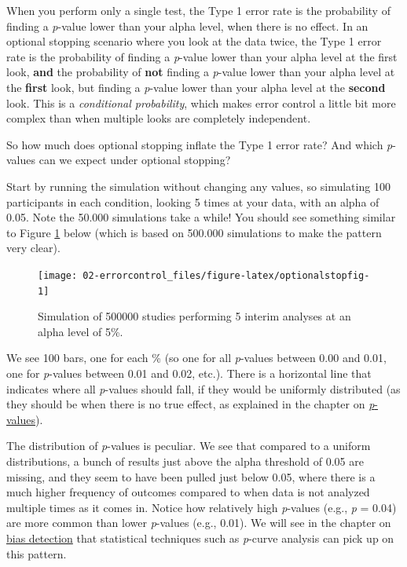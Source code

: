 \documentclass[
  oneside]{krantz}
\begin{document}
When you perform only a single test, the Type 1 error rate is the probability of finding a \emph{p}-value lower than your alpha level, when there is no effect. In an optional stopping scenario where you look at the data twice, the Type 1 error rate is the probability of finding a \emph{p}-value lower than your alpha level at the first look, \textbf{and} the probability of \textbf{not} finding a \emph{p}-value lower than your alpha level at the \textbf{first} look, but finding a \emph{p}-value lower than your alpha level at the \textbf{second} look. This is a \emph{conditional probability}, which makes error control a little bit more complex than when multiple looks are completely independent.

So how much does optional stopping inflate the Type 1 error rate? And which \emph{p}-values can we expect under optional stopping?

Start by running the simulation without changing any values, so simulating 100 participants in each condition, looking 5 times at your data, with an alpha of 0.05. Note the 50.000 simulations take a while! You should see something similar to Figure \ref{fig:optionalstopfig} below (which is based on 500.000 simulations to make the pattern very clear).



\begin{figure}

{\centering \texttt{[image: 02-errorcontrol\_files/figure-latex/optionalstopfig-1]} 

}

\caption{Simulation of 500000 studies performing 5 interim analyses at an alpha level of 5\%.}\label{fig:optionalstopfig}
\end{figure}

We see 100 bars, one for each \% (so one for all \emph{p}-values between 0.00 and 0.01, one for \emph{p}-values between 0.01 and 0.02, etc.). There is a horizontal line that indicates where all \emph{p}-values should fall, if they would be uniformly distributed (as they should be when there is no true effect, as explained in the chapter on \protect\hyperlink{pvalues}{\emph{p}-values}).

The distribution of \emph{p}-values is peculiar. We see that compared to a uniform distributions, a bunch of results just above the alpha threshold of 0.05 are missing, and they seem to have been pulled just below 0.05, where there is a much higher frequency of outcomes compared to when data is not analyzed multiple times as it comes in. Notice how relatively high \emph{p}-values (e.g., \emph{p} = 0.04) are more common than lower \emph{p}-values (e.g., 0.01). We will see in the chapter on \href{bias}{bias detection} that statistical techniques such as \emph{p}-curve analysis can pick up on this pattern.
\end{document}
